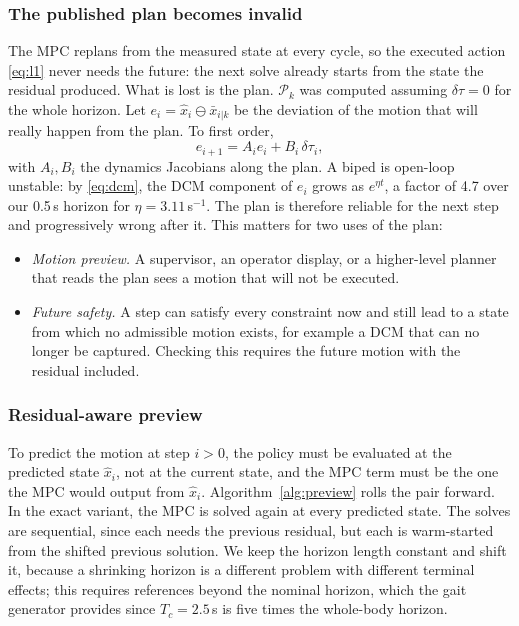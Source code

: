 \documentclass[conference]{IEEEtran}
\newcommand{\xb}{\bar{x}}
\newcommand{\xh}{\hat{x}}
\begin{document}
\subsubsection{The published plan becomes invalid}
The MPC replans from the measured state at every cycle, so the executed action \eqref{eq:l1} never needs the future: the next solve already starts from the state the residual produced.
What is lost is the plan.
$\mathcal P_k$ was computed assuming $\delta\tau=0$ for the whole horizon.
Let $e_i=\xh_i\ominus\xb_{i|k}$ be the deviation of the motion that will really happen from the plan.
To first order,
\begin{equation}
e_{i+1}=A_ie_i+B_i\,\delta\tau_i ,
\label{eq:err}
\end{equation}
with $A_i,B_i$ the dynamics Jacobians along the plan.
A biped is open-loop unstable: by \eqref{eq:dcm}, the DCM component of $e_i$ grows as $e^{\eta t}$, a factor of 4.7 over our 0.5\,s horizon for $\eta=3.11$\,s$^{-1}$.
The plan is therefore reliable for the next step and progressively wrong after it.
This matters for two uses of the plan:
\begin{itemize}
\item \emph{Motion preview.} A supervisor, an operator display, or a higher-level planner that reads the plan sees a motion that will not be executed.
\item \emph{Future safety.} A step can satisfy every constraint now and still lead to a state from which no admissible motion exists, for example a DCM that can no longer be captured. Checking this requires the future motion with the residual included.
\end{itemize}

\subsubsection{Residual-aware preview}
To predict the motion at step $i>0$, the policy must be evaluated at the predicted state $\xh_i$, not at the current state, and the MPC term must be the one the MPC would output from $\xh_i$.
Algorithm~\ref{alg:preview} rolls the pair forward.
In the exact variant, the MPC is solved again at every predicted state.
The solves are sequential, since each needs the previous residual, but each is warm-started from the shifted previous solution.
We keep the horizon length constant and shift it, because a shrinking horizon is a different problem with different terminal effects; this requires references beyond the nominal horizon, which the gait generator provides since $T_c=2.5$\,s is five times the whole-body horizon.
\end{document}
